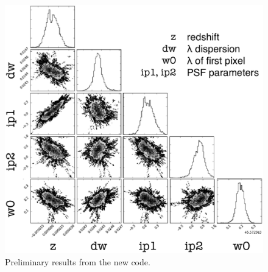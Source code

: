 \begin{figure}
\centering
\includegraphics[scale=0.3]{conclusion/mcmcplot-labeled.eps}
\caption{Preliminary results from the new code.
\label{conclusion:fig:mcmc}}
\end{figure}
